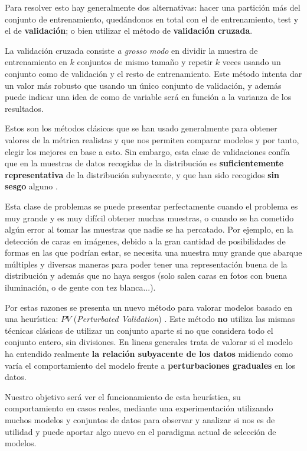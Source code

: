 Para resolver esto hay generalmente dos alternativas: hacer una partición más del conjunto de entrenamiento, quedándonos en total con el de entrenamiento, test y el de \textbf{validación}; o bien utilizar el método de \textbf{validación cruzada}.

La validación cruzada consiste \emph{a grosso modo} en dividir la muestra de entrenamiento en $k$ conjuntos de mismo tamaño y repetir $k$ veces usando un conjunto como de validación y el resto de entrenamiento. Este método intenta dar un valor más robusto que usando un único conjunto de validación, y además puede indicar una idea de como de variable será en función a la varianza de los resultados.

Estos son los métodos clásicos que se han usado generalmente para obtener valores de la métrica realistas y que nos permiten comparar modelos y por tanto, elegir los mejores en base a esto. Sin embargo, esta clase de validaciones confía que en la muestras de datos recogidas de la distribución es \textbf{suficientemente representativa} de la distribución subyacente, y que han sido recogidos \textbf{sin sesgo} alguno \cite{zhang2019perturbation}.

Esta clase de problemas se puede presentar perfectamente cuando el problema es muy grande y es muy difícil obtener muchas muestras, o cuando se ha cometido algún error al tomar las muestras que nadie se ha percatado. Por ejemplo, en la detección de caras en imágenes, debido a la gran cantidad de posibilidades de formas en las que podrían estar, se necesita una muestra muy grande que abarque múltiples y diversas maneras para poder tener una representación buena de la distribución y además que no haya sesgos (solo salen caras en fotos con buena iluminación, o de gente con tez blanca...).

Por estas razones se presenta un nuevo método para valorar modelos basado en una heurística: $PV$ (\emph{Perturbated Validation}) \cite{zhang2019perturbation}. Este método \textbf{no} utiliza las mismas técnicas clásicas de utilizar un conjunto aparte si no que considera todo el conjunto entero, sin divisiones. En lineas generales trata de valorar si el modelo ha entendido realmente \textbf{la relación subyacente de los datos} midiendo como varía el comportamiento del modelo frente a \textbf{perturbaciones graduales} en los datos.

Nuestro objetivo será ver el funcionamiento de esta heurística, su comportamiento en casos reales, mediante una experimentación utilizando muchos modelos y conjuntos de datos para observar y analizar si nos es de utilidad y puede aportar algo nuevo en el paradigma actual de selección de modelos.

